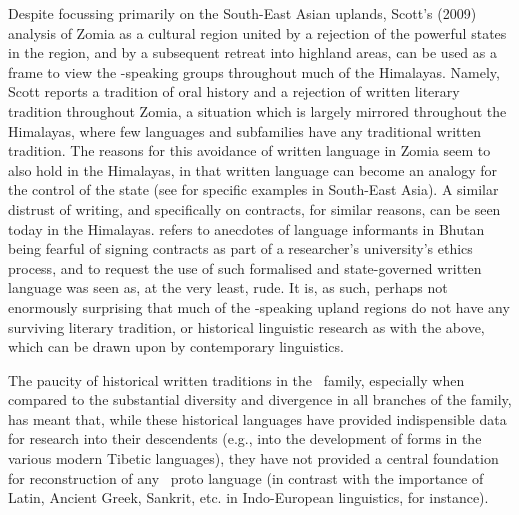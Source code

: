 Despite focussing primarily on the South-East Asian uplands, Scott's (2009) analysis of Zomia as a cultural region united by a rejection of the powerful states in the region, and by a subsequent retreat into highland areas, can be used as a frame to view the \lfam-speaking groups throughout much of the Himalayas. Namely, Scott reports a tradition of oral history and a rejection of written literary tradition throughout Zomia, a situation which is largely mirrored throughout the Himalayas, where few languages and subfamilies have any traditional written tradition. The reasons for this avoidance of written language in Zomia seem to also hold in the Himalayas, in that written language can become an analogy for the control of the state (see  for specific examples in South-East Asia). A similar distrust of writing, and specifically on contracts, for similar reasons, can be seen today in the Himalayas.  refers to anecdotes of language informants in Bhutan being fearful of signing contracts as part of a researcher's university's ethics process, and to request the use of such formalised and state-governed written language was seen as, at the very least, rude.  It is, as such, perhaps not enormously surprising that much of the \lfam-speaking upland regions do not have any surviving literary tradition, or historical linguistic research as with the above, which can be drawn upon by contemporary linguistics.

The paucity of historical written traditions in the \lfam\ family, especially when compared to the substantial diversity and divergence in all branches of the family, has meant that, while these historical languages have provided indispensible data for research into their descendents (e.g., into the development of forms in the various modern Tibetic languages), they have not provided a central foundation for reconstruction of any \lfam\ proto language \cite{STEDT} (in contrast with the importance of Latin, Ancient Greek, Sankrit, etc. in Indo-European linguistics, for instance).

